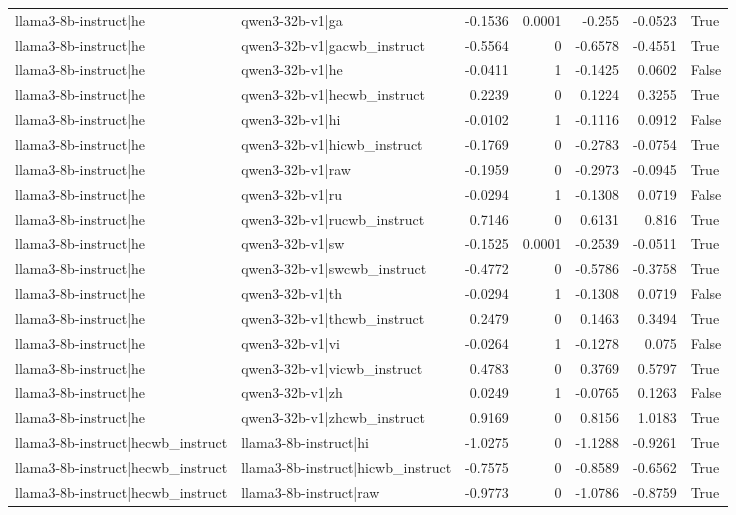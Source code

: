\begin{table}
\begin{tabular}{l l r r r r l}
llama3-8b-instruct|he & qwen3-32b-v1|ga & -0.1536 & 0.0001 & -0.255 & -0.0523 & True \\
llama3-8b-instruct|he & qwen3-32b-v1|gacwb_instruct & -0.5564 & 0 & -0.6578 & -0.4551 & True \\
llama3-8b-instruct|he & qwen3-32b-v1|he & -0.0411 & 1 & -0.1425 & 0.0602 & False \\
llama3-8b-instruct|he & qwen3-32b-v1|hecwb_instruct & 0.2239 & 0 & 0.1224 & 0.3255 & True \\
llama3-8b-instruct|he & qwen3-32b-v1|hi & -0.0102 & 1 & -0.1116 & 0.0912 & False \\
llama3-8b-instruct|he & qwen3-32b-v1|hicwb_instruct & -0.1769 & 0 & -0.2783 & -0.0754 & True \\
llama3-8b-instruct|he & qwen3-32b-v1|raw & -0.1959 & 0 & -0.2973 & -0.0945 & True \\
llama3-8b-instruct|he & qwen3-32b-v1|ru & -0.0294 & 1 & -0.1308 & 0.0719 & False \\
llama3-8b-instruct|he & qwen3-32b-v1|rucwb_instruct & 0.7146 & 0 & 0.6131 & 0.816 & True \\
llama3-8b-instruct|he & qwen3-32b-v1|sw & -0.1525 & 0.0001 & -0.2539 & -0.0511 & True \\
llama3-8b-instruct|he & qwen3-32b-v1|swcwb_instruct & -0.4772 & 0 & -0.5786 & -0.3758 & True \\
llama3-8b-instruct|he & qwen3-32b-v1|th & -0.0294 & 1 & -0.1308 & 0.0719 & False \\
llama3-8b-instruct|he & qwen3-32b-v1|thcwb_instruct & 0.2479 & 0 & 0.1463 & 0.3494 & True \\
llama3-8b-instruct|he & qwen3-32b-v1|vi & -0.0264 & 1 & -0.1278 & 0.075 & False \\
llama3-8b-instruct|he & qwen3-32b-v1|vicwb_instruct & 0.4783 & 0 & 0.3769 & 0.5797 & True \\
llama3-8b-instruct|he & qwen3-32b-v1|zh & 0.0249 & 1 & -0.0765 & 0.1263 & False \\
llama3-8b-instruct|he & qwen3-32b-v1|zhcwb_instruct & 0.9169 & 0 & 0.8156 & 1.0183 & True \\
llama3-8b-instruct|hecwb_instruct & llama3-8b-instruct|hi & -1.0275 & 0 & -1.1288 & -0.9261 & True \\
llama3-8b-instruct|hecwb_instruct & llama3-8b-instruct|hicwb_instruct & -0.7575 & 0 & -0.8589 & -0.6562 & True \\
llama3-8b-instruct|hecwb_instruct & llama3-8b-instruct|raw & -0.9773 & 0 & -1.0786 & -0.8759 & True \\

\end{tabular}
\end{table}
